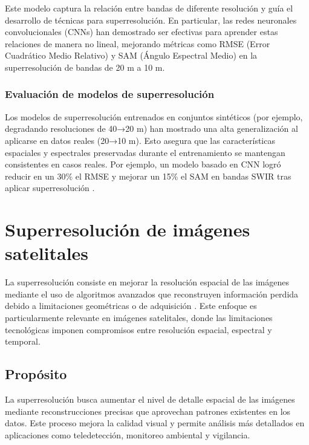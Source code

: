             Este modelo captura la relación entre bandas de diferente resolución y guía el desarrollo de técnicas para superresolución. En particular, las redes neuronales convolucionales (CNNs) han demostrado ser efectivas para aprender estas relaciones de manera no lineal, mejorando métricas como RMSE (Error Cuadrático Medio Relativo) y SAM (Ángulo Espectral Medio) en la superresolución de bandas de 20 m a 10 m.
                
        \subsubsection{Evaluación de modelos de superresolución}
                
            Los modelos de superresolución entrenados en conjuntos sintéticos (por ejemplo, degradando resoluciones de 40→20 m) han mostrado una alta generalización al aplicarse en datos reales (20→10 m). Esto asegura que las características espaciales y espectrales preservadas durante el entrenamiento se mantengan consistentes en casos reales. Por ejemplo, un modelo basado en CNN logró reducir en un 30\% el RMSE y mejorar un 15\% el SAM en bandas SWIR tras aplicar superresolución \autocite{lanaras2018super}.
            
\section{Superresolución de imágenes satelitales}

    La superresolución consiste en mejorar la resolución espacial de las imágenes mediante el uso de algoritmos avanzados que reconstruyen información perdida debido a limitaciones geométricas o de adquisición \autocite{he2023spectral}. Este enfoque es particularmente relevante en imágenes satelitales, donde las limitaciones tecnológicas imponen compromisos entre resolución espacial, espectral y temporal.

    \subsection{Propósito}

        La superresolución busca aumentar el nivel de detalle espacial de las imágenes mediante reconstrucciones precisas que aprovechan patrones existentes en los datos. Este proceso mejora la calidad visual y permite análisis más detallados en aplicaciones como teledetección, monitoreo ambiental y vigilancia.

